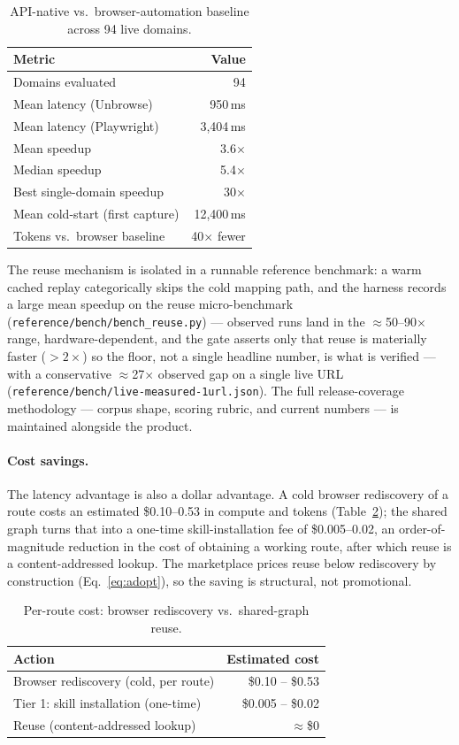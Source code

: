 \documentclass[11pt]{article}
\begin{document}
\begin{table}[h]
\centering
\begin{tabular}{lr}
\toprule
Metric & Value \\
\midrule
Domains evaluated & 94 \\
Mean latency (Unbrowse) & 950\,ms \\
Mean latency (Playwright) & 3{,}404\,ms \\
Mean speedup & 3.6$\times$ \\
Median speedup & 5.4$\times$ \\
Best single-domain speedup & 30$\times$ \\
Mean cold-start (first capture) & 12{,}400\,ms \\
Tokens vs.\ browser baseline & 40$\times$ fewer \\
\bottomrule
\end{tabular}
\caption{API-native vs.\ browser-automation baseline across 94 live domains.}
\label{tab:eval}
\end{table}

The reuse mechanism is isolated in a runnable reference benchmark: a warm cached
replay categorically skips the cold mapping path, and the harness records a large
mean speedup on the reuse micro-benchmark (\texttt{reference/bench/bench\_reuse.py})
--- observed runs land in the $\approx$50--90$\times$ range, hardware-dependent, and
the gate asserts only that reuse is materially faster ($>2\times$) so the floor, not
a single headline number, is what is verified --- with a conservative
$\approx$27$\times$ observed gap on a single live URL
(\texttt{reference/bench/live-measured-1url.json}). The full
release-coverage methodology --- corpus shape, scoring rubric, and current numbers
--- is maintained alongside the product.

\paragraph{Cost savings.} The latency advantage is also a dollar advantage. A cold
browser rediscovery of a route costs an estimated \$0.10--0.53 in compute and tokens
(Table~\ref{tab:cost}); the shared graph turns that into a one-time
skill-installation fee of \$0.005--0.02, an order-of-magnitude reduction in the cost
of obtaining a working route, after which reuse is a content-addressed lookup. The
marketplace prices reuse below rediscovery by construction (Eq.~\ref{eq:adopt}), so
the saving is structural, not promotional.

\begin{table}[h]
\centering
\begin{tabular}{lr}
\toprule
Action & Estimated cost \\
\midrule
Browser rediscovery (cold, per route) & \$0.10 -- \$0.53 \\
Tier 1: skill installation (one-time) & \$0.005 -- \$0.02 \\
Reuse (content-addressed lookup) & $\approx$\$0 \\
\bottomrule
\end{tabular}
\caption{Per-route cost: browser rediscovery vs.\ shared-graph reuse.}
\label{tab:cost}
\end{table}
\end{document}
